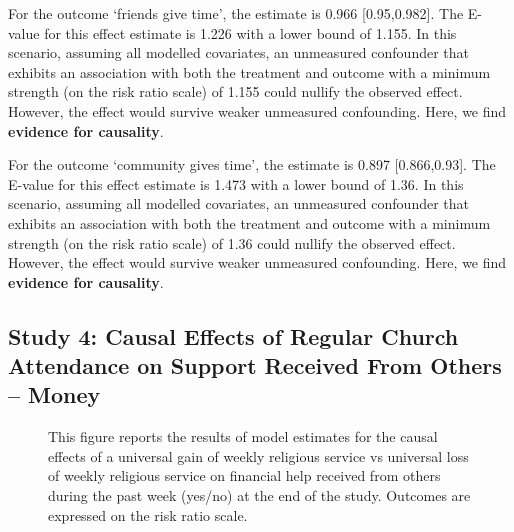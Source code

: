 \documentclass[
  singlecolumn]{article}
\begin{document}
For the outcome `friends give time', the estimate is 0.966
{[}0.95,0.982{]}. The E-value for this effect estimate is 1.226 with a
lower bound of 1.155. In this scenario, assuming all modelled
covariates, an unmeasured confounder that exhibits an association with
both the treatment and outcome with a minimum strength (on the risk
ratio scale) of 1.155 could nullify the observed effect. However, the
effect would survive weaker unmeasured confounding. Here, we find
\textbf{evidence for causality}.

For the outcome `community gives time', the estimate is 0.897
{[}0.866,0.93{]}. The E-value for this effect estimate is 1.473 with a
lower bound of 1.36. In this scenario, assuming all modelled covariates,
an unmeasured confounder that exhibits an association with both the
treatment and outcome with a minimum strength (on the risk ratio scale)
of 1.36 could nullify the observed effect. However, the effect would
survive weaker unmeasured confounding. Here, we find \textbf{evidence
for causality}.

\newpage{}

\subsection{Study 4: Causal Effects of Regular Church Attendance on
Support Received From Others --
Money}\label{study-4-causal-effects-of-regular-church-attendance-on-support-received-from-others-money}

\begin{figure}


\caption{\label{fig-4_1}This figure reports the results of model
estimates for the causal effects of a universal gain of weekly religious
service vs universal loss of weekly religious service on financial help
received from others during the past week (yes/no) at the end of the
study. Outcomes are expressed on the risk ratio scale.}

\end{figure}%
\end{document}
